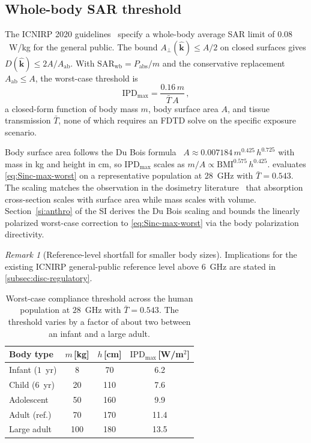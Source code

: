 \documentclass[journal,twocolumn,10pt]{IEEEtran}
\theoremstyle{plain}
\theoremstyle{remark}
\newtheorem{remark}[theorem]{Remark}
\newcommand{\khat}{\hat{\bm{k}}}
\newcommand{\IPD}{\mathrm{IPD}}
\newcommand{\Aab}{A_{\mathrm{ab}}}
\newcommand{\Aperp}{A_\perp}
\newcommand{\Tbar}{\bar{T}}
\begin{document}
\subsection{Whole-body SAR threshold}\label{subsec:compl-wb}
The ICNIRP 2020 guidelines~\cite{ICNIRP2020} specify a whole-body
average SAR limit of $0.08$~W/kg for the general public. The bound
$\Aperp(\khat) \le A/2$ on closed surfaces gives
$D(\khat) \le 2A/\Aab$. With $\mathrm{SAR}_{\mathrm{wb}} =
P_{\mathrm{abs}}/m$ and the conservative replacement $\Aab \le A$,
the worst-case threshold is
\begin{equation}\label{eq:Sinc-max-worst}
  \IPD_{\mathrm{max}} = \frac{0.16\,m}{\Tbar\,A}\, ,
\end{equation}
a closed-form function of body mass $m$, body surface area $A$,
and tissue transmission $\Tbar$, none of which requires an FDTD
solve on the specific exposure scenario.

Body surface area follows the Du Bois formula~\cite{DuBois1916} $A
\approx 0.007184\,m^{0.425}\,h^{0.725}$ with mass in kg and height in
cm, so $\IPD_{\mathrm{max}}$ scales as $m/A \propto
\mathrm{BMI}^{0.575}\,h^{0.425}$.  evaluates
\eqref{eq:Sinc-max-worst} on a representative population at
$28$~GHz with $\Tbar = 0.543$. The scaling
matches the observation in the dosimetry
literature~\cite{Hirata2007corr,Dimbylow2002} that absorption
cross-section scales with surface area while mass scales with
volume. Section~\ref{si:anthro} of the SI derives the Du Bois
scaling and bounds the linearly polarized worst-case correction to
\eqref{eq:Sinc-max-worst} via the body polarization directivity.

\begin{remark}[Reference-level shortfall for smaller body sizes]
\label{rem:reflevel-shortfall}
Implications for the existing ICNIRP general-public reference level
above $6$~GHz are stated in \cref{subsec:disc-regulatory}.
\end{remark}

\begin{table}[!t]
\centering
\caption{Worst-case compliance threshold across the human
population at $28$~GHz with $\Tbar = 0.543$. The threshold
varies by a factor of about two between an infant and a large adult.}
\label{tab:anthro}
\small
\setlength{\tabcolsep}{3pt}
\begin{tabular}{lccc}
\toprule
Body type & $m$\,[kg] & $h$\,[cm] & $\IPD_{\mathrm{max}}$\,[W/m$^2$] \\
\midrule
Infant ($1$~yr) & 8   & 70  & 6.2  \\
Child ($6$~yr)  & 20  & 110 & 7.6  \\
Adolescent      & 50  & 160 & 9.9  \\
Adult (ref.)    & 70  & 170 & 11.4 \\
Large adult     & 100 & 180 & 13.5 \\
\bottomrule
\end{tabular}
\end{table}
\end{document}
